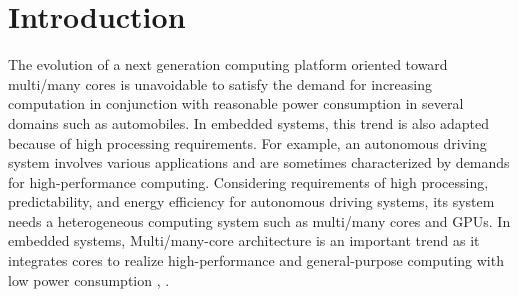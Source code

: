 \documentclass[conference,compsoc]{IEEEtran}
\newcommand{\comment}[1]{}
\begin{document}

\vspace{-3mm}
\section{Introduction}
\vspace{-3mm}
\comment{1-4, 1-5, 1-6, 2-1, 2-4}
The evolution of a next generation computing platform oriented toward multi/many cores is unavoidable to satisfy the demand for increasing computation in conjunction with reasonable power consumption in several domains such as automobiles.
In embedded systems, this trend is also adapted because of high processing requirements.
For example, an autonomous driving system involves various applications and are sometimes characterized by demands for high-performance computing.
Considering requirements of high processing, predictability, and energy efficiency for autonomous driving systems, its system needs a heterogeneous computing system such as multi/many cores and GPUs.
\comment{1-3} In embedded systems, Multi/many-core architecture is an important trend as it integrates cores to realize high-performance and general-purpose computing with low power consumption \cite{becker2016contention}, \cite{perret2016mapping}.

\end{document}
